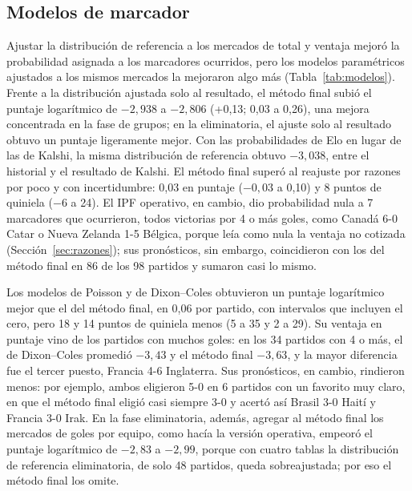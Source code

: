 \documentclass[12pt]{article}
\theoremstyle{plain}
\theoremstyle{remark}
\begin{document}
\FloatBarrier
\subsection{Modelos de marcador}
\label{sec:modelos}

Ajustar la distribución de referencia a los mercados de total y
ventaja mejoró la probabilidad asignada a los marcadores ocurridos,
pero los modelos paramétricos ajustados a los mismos mercados la
mejoraron algo más (Tabla~\ref{tab:modelos}).
Frente a la distribución ajustada solo al resultado, el método final
subió el puntaje logarítmico de $-2{,}938$ a $-2{,}806$ (+0,13; 0,03 a
0,26), una mejora concentrada en la fase de grupos; en la
eliminatoria, el ajuste solo al resultado obtuvo un puntaje
ligeramente mejor.
Con las probabilidades de Elo en lugar de las de Kalshi, la misma
distribución de referencia obtuvo $-3{,}038$, entre el historial y el
resultado de Kalshi.
El método final superó al reajuste por razones por poco y con
incertidumbre: 0,03 en puntaje ($-0{,}03$ a 0,10) y 8 puntos de
quiniela ($-6$ a 24).
El IPF operativo, en cambio, dio probabilidad nula a 7 marcadores que
ocurrieron, todos victorias por 4 o más goles, como Canadá 6-0 Catar
o Nueva Zelanda 1-5 Bélgica, porque leía como nula la ventaja no
cotizada (Sección~\ref{sec:razones}); sus pronósticos, sin embargo,
coincidieron con los del método final en 86 de los 98 partidos y
sumaron casi lo mismo.

Los modelos de Poisson y de Dixon--Coles obtuvieron un puntaje
logarítmico mejor que el del método final, en 0,06 por partido, con
intervalos que incluyen el cero, pero 18 y 14 puntos de quiniela menos
(5 a 35 y 2 a 29).
Su ventaja en puntaje vino de los partidos con muchos goles: en los
34 partidos con 4 o más, el de Dixon--Coles promedió $-3{,}43$ y el
método final $-3{,}63$, y la mayor diferencia fue el tercer puesto,
Francia 4-6 Inglaterra.
Sus pronósticos, en cambio, rindieron menos: por ejemplo, ambos
eligieron 5-0 en 6 partidos con un favorito muy claro, en que el
método final eligió casi siempre 3-0 y acertó así Brasil 3-0 Haití y
Francia 3-0 Irak.
En la fase eliminatoria, además, agregar al método final los mercados
de goles por equipo, como hacía la versión operativa, empeoró el
puntaje logarítmico de $-2{,}83$ a $-2{,}99$, porque con cuatro tablas
la distribución de referencia eliminatoria, de solo 48 partidos,
queda sobreajustada; por eso el método final los omite.
\end{document}
